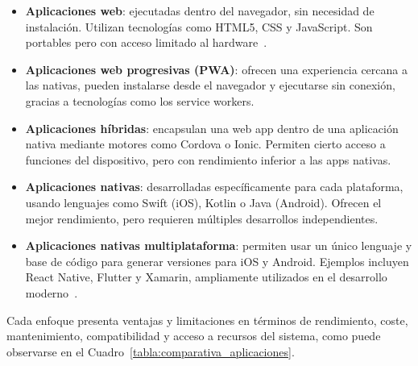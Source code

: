 \begin{itemize}
    \item \textbf{Aplicaciones web}: ejecutadas dentro del navegador, sin necesidad de instalación. Utilizan tecnologías como HTML5, CSS y JavaScript. Son portables pero con acceso limitado al hardware~\cite{nguyen2018}.
    \item \textbf{Aplicaciones web progresivas (PWA)}: ofrecen una experiencia cercana a las nativas, pueden instalarse desde el navegador y ejecutarse sin conexión, gracias a tecnologías como los service workers.
    \item \textbf{Aplicaciones híbridas}: encapsulan una web app dentro de una aplicación nativa mediante motores como Cordova o Ionic. Permiten cierto acceso a funciones del dispositivo, pero con rendimiento inferior a las apps nativas.
    \item \textbf{Aplicaciones nativas}: desarrolladas específicamente para cada plataforma, usando lenguajes como Swift (iOS), Kotlin o Java (Android). Ofrecen el mejor rendimiento, pero requieren múltiples desarrollos independientes.
    \item \textbf{Aplicaciones nativas multiplataforma}: permiten usar un único lenguaje y base de código para generar versiones para iOS y Android. Ejemplos incluyen React Native, Flutter y Xamarin, ampliamente utilizados en el desarrollo moderno~\cite{gartner2022}.
\end{itemize}

Cada enfoque presenta ventajas y limitaciones en términos de rendimiento, coste, mantenimiento, compatibilidad y acceso a recursos del sistema, como puede observarse en el Cuadro~\ref{tabla:comparativa_aplicaciones}.


